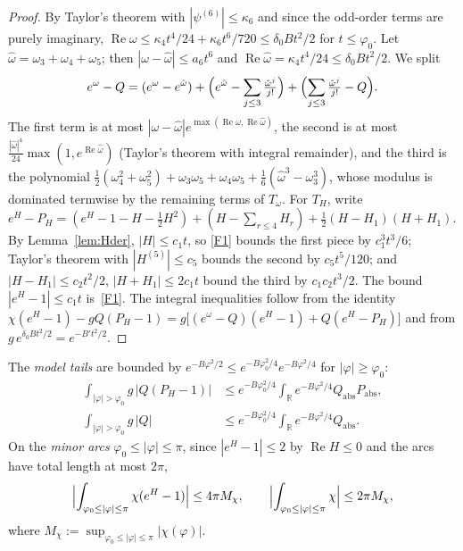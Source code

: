 \documentclass[11pt]{amsart}
\theoremstyle{definition}
\theoremstyle{remark}
\numberwithin{equation}{section}
\newcommand{\RR}{\mathbb{R}}
\newcommand{\re}{\operatorname{Re}}
\begin{document}
\begin{proof}
By Taylor's theorem with $|\psi^{(6)}|\le\kappa_6$ and since the odd-order terms are purely imaginary,
$\re\omega\le\kappa_4t^4/24+\kappa_6t^6/720\le\delta_0Bt^2/2$ for $t\le\varphi_0$. Let $\hat\omega=\omega_3+\omega_4+\omega_5$; then
$|\omega-\hat\omega|\le a_6t^6$ and $\re\hat\omega=\kappa_4t^4/24\le\delta_0Bt^2/2$. We split
\[
  e^\omega-Q=(e^\omega-e^{\hat\omega})+\Bigl(e^{\hat\omega}-\sum_{j\le3}\tfrac{\hat\omega^j}{j!}\Bigr)+\Bigl(\sum_{j\le3}\tfrac{\hat\omega^j}{j!}-Q\Bigr).
\]
The first term is at most $|\omega-\hat\omega|e^{\max(\re\omega,\re\hat\omega)}$, the second is at most
$\frac{|\hat\omega|^4}{24}\max(1,e^{\re\hat\omega})$ (Taylor's theorem with integral remainder), and the third is the polynomial
$\frac12(\omega_4^2+\omega_5^2)+\omega_3\omega_5+\omega_4\omega_5+\frac16(\hat\omega^3-\omega_3^3)$, whose modulus is dominated termwise by
the remaining terms of $T_\omega$. For $T_H$, write
$e^H-P_H=(e^H-1-H-\frac12H^2)+(H-\sum_{r\le4}H_r)+\frac12(H-H_1)(H+H_1)$. By Lemma~\ref{lem:Hder}, $|H|\le c_1t$, so
\ref{F1} bounds the first piece by $c_1^3t^3/6$; Taylor's theorem with $|H^{(5)}|\le c_5$ bounds the second by $c_5t^5/120$; and
$|H-H_1|\le c_2t^2/2$, $|H+H_1|\le2c_1t$ bound the third by $c_1c_2t^3/2$. The bound $|e^H-1|\le c_1t$ is~\ref{F1}. The integral
inequalities follow from the identity
$\chi(e^H-1)-gQ(P_H-1)=g\bigl[(e^\omega-Q)(e^H-1)+Q(e^H-P_H)\bigr]$ and from $g\,e^{\delta_0Bt^2/2}=e^{-B't^2/2}$.
\end{proof}

The \emph{model tails} are bounded by $e^{-B\varphi^2/2}\le e^{-B\varphi_0^2/4}e^{-B\varphi^2/4}$ for $|\varphi|\ge\varphi_0$:
\begin{equation}\label{eq:tails}
\begin{aligned}
  \int_{|\varphi|>\varphi_0}g\,|Q(P_H-1)|&\le e^{-B\varphi_0^2/4}\int_\RR e^{-B\varphi^2/4}Q_{\mathrm{abs}}P_{\mathrm{abs}},\\
  \int_{|\varphi|>\varphi_0}g\,|Q|&\le e^{-B\varphi_0^2/4}\int_\RR e^{-B\varphi^2/4}Q_{\mathrm{abs}} .
\end{aligned}
\end{equation}
On the \emph{minor arcs} $\varphi_0\le|\varphi|\le\pi$, since $|e^H-1|\le2$ by $\re H\le0$ and the arcs have total length at most $2\pi$,
\begin{equation}\label{eq:minor}
  \Bigl|\int_{\varphi_0\le|\varphi|\le\pi}\chi(e^H-1)\Bigr|\le4\pi M_\chi,\qquad \Bigl|\int_{\varphi_0\le|\varphi|\le\pi}\chi\Bigr|\le2\pi M_\chi,
\end{equation}
where $M_\chi:=\sup_{\varphi_0\le|\varphi|\le\pi}|\chi(\varphi)|$.
\end{document}
